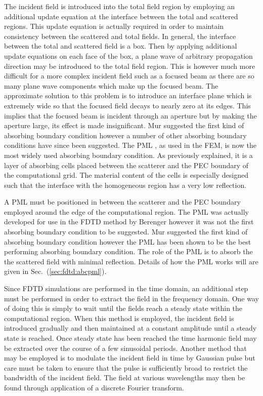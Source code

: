 \documentclass[a4paper, 12pt]{article}
\newcommand{\sect}[1]{Sec.\ (\ref{#1})}
\begin{document}
	The incident
	field is introduced into the total field region by employing an
	additional update equation at the interface between the total and
	scattered regions. This update equation is actually required in order
	to maintain consistency between the scattered and total fields. In
	general, the interface between the total and scattered field is
	a box. Then by applying additional update equations on each face
	of the box, a plane wave of arbitrary propagation direction may be
	introduced to the total field region. This is however much more
	difficult for a more complex incident field such as a focused beam as
	there are so many plane wave components which make up the focused
	beam. The approximate solution to this problem is to introduce an
	interface plane which is extremely wide so that the focused field
	decays to nearly zero at its edges. This implies that the focused
	beam is incident through an aperture but by making the aperture large,
	its effect is made insignificant. Mur \cite{mur81ieeetransemc377} suggested the first kind of absorbing boundary
	condition however a number of other absorbing boundary conditions have
	since been suggested. The PML \cite{berenger94journcopmphys185}, as
	used in the FEM, is now the most widely used absorbing boundary
	condition. As previously explained, it is a layer of absorbing cells
	placed between the scatterer and the PEC boundary of the computational
	grid. The material content of the cells is especially designed such
	that the interface with the homogeneous region has a very low
	reflection.  
	
	A PML must be positioned in between the
	scatterer and the PEC boundary employed around the edge of the
	computational region. The PML was actually developed for use in the
	FDTD method by Berenger \cite{berenger94journcopmphys185} however it
	was not the first absorbing boundary condition to be suggested. Mur
	\cite{mur81ieeetransemc377} suggested the first kind of absorbing boundary
	condition however the PML has been shown to be the best performing
	absorbing boundary condition. The role of the PML is to absorb the the
	scattered field with minimal reflection. Details of how the PML works
	will are given in \sect{sec:fdtd:abcpml}.
	
	Since FDTD simulations are performed in the time domain, an additional
	step must be performed in order to extract the field in the frequency
	domain. One way of doing this is simply to wait until the fields reach
	a steady state within the computational region. When this method is
	employed, the incident field is introduced gradually and then
	maintained at a constant amplitude until a steady state is
	reached. Once steady state has been reached the time harmonic field
	may be extracted over the course of a few sinusoidal periods. Another
	method that may be employed is to modulate the incident field in time
	by Gaussian pulse but care must be taken to ensure that the pulse is
	sufficiently broad to restrict the bandwidth of the incident
	field. The field at various wavelengths may then be found through
	application of a discrete Fourier transform. 
	
\end{document}

